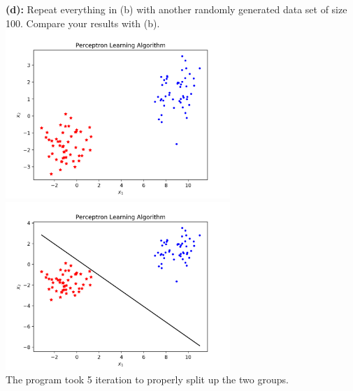 \documentclass[a4paper]{article}
\begin{document}
\indent \textbf{(d):} Repeat everything in (b) with another randomly
generated data set of size 100. Compare your results with (b). \\
\includegraphics[width=85mm]{d_1.png} 
\includegraphics[width=85mm]{d_2.png} \\
The program took 5 iteration to properly split up the two groups.\\
\end{document}
